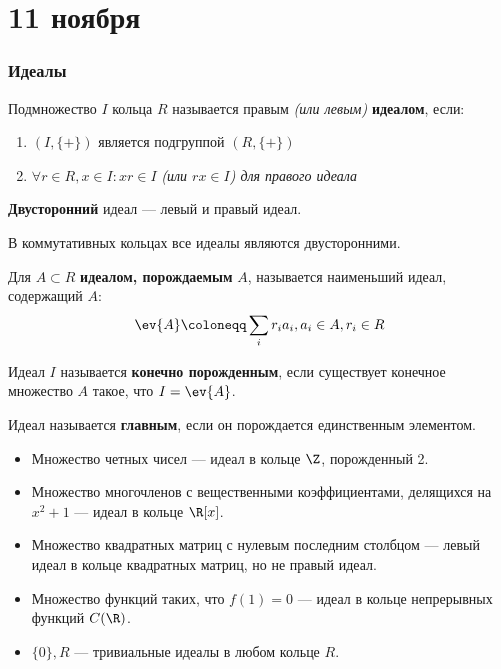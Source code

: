 \chapter{11 ноября}

\subsection{Идеалы}

\begin{definition}
    Подмножество \(I\) кольца \(R\) называется правым \textit{(или левым)}
    \textbf{идеалом}, если:
    \begin{enumerate}
        \item \((I, \{+\})\) является подгруппой \((R, \{+\})\)
        \item \(\forall r \in R, x \in I : xr \in I\)
        \textit{(или \(rx \in I\)) для правого идеала}
    \end{enumerate}
    
    \textbf{Двусторонний} идеал --- левый и правый идеал.
\end{definition}

В коммутативных кольцах все идеалы являются двусторонними.

\begin{definition}
    Для \(A \subset R\) \textbf{идеалом, порождаемым} \(A\), называется
    наименьший идеал, содержащий \(A\):
    \[\ev{A} \coloneqq \sum_i r_i a_i, a_i \in A, r_i \in R\]
\end{definition}

\begin{definition}
    Идеал \(I\) называется \textbf{конечно порожденным},
    если существует конечное множество \(A\) такое, что \(I = \ev{A}\).
\end{definition}

\begin{definition}
    Идеал называется \textbf{главным},
    если он порождается единственным элементом.
\end{definition}

\begin{example}\itemfix
    \begin{itemize}
        \item Множество четных чисел --- идеал в кольце \(\Z\), порожденный 2.
        \item Множество многочленов с вещественными коэффициентами,
        делящихся на \(x^2 + 1\) --- идеал в кольце \(\R[x]\).
        \item Множество квадратных матриц с нулевым последним столбцом
        --- левый идеал в кольце квадратных матриц, но не правый идеал.
        \item Множество функций таких, что \(f(1) = 0\) --- идеал в кольце
        непрерывных функций \(C(\R)\).
        \item \(\{0\}, R\) --- тривиальные идеалы в любом кольце \(R\).
    \end{itemize}
\end{example}

